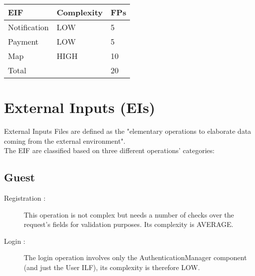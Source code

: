 \begin{center}
  \begin{tabular}{ |l|l|l| }
    \hline
    EIF & Complexity & FPs \\ \hline
    Notification & LOW & 5 \\ \hline
    Payment & LOW & 5 \\ \hline
    Map & HIGH & 10 \\ \hline
    \multicolumn{2}{|l|}{Total} & 20 \\ \hline
  \end{tabular}
\end{center}


\newpage
\section{External Inputs (EIs)}
External Inputs Files are defined as the "elementary operations to elaborate data coming from the external environment".\\
The EIF are classified based on three different operations' categories:\\

\subsection{Guest}
\begin{description}
	\item [Registration :] This operation is not complex but needs a number of checks over the request's fields for validation purposes. Its complexity is AVERAGE.
	\item [Login :] The login operation involves only the AuthenticationManager component (and just the User ILF), its complexity is therefore LOW.
\end{description}

